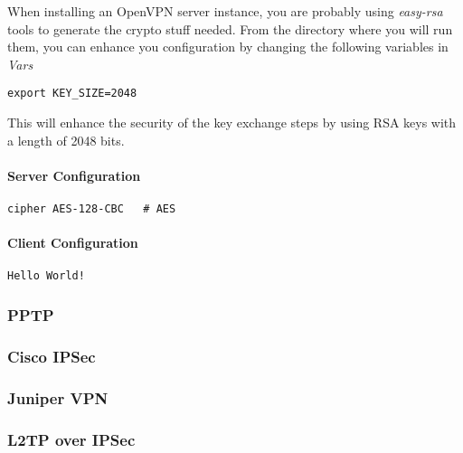 When installing an OpenVPN server instance, you are probably using {\it easy-rsa} tools to generate the crypto stuff needed.
From the directory where you will run them, you can enhance you configuration by changing the following variables in {\it Vars}

\begin{lstlisting}[breaklines]
export KEY_SIZE=2048 
\end{lstlisting}

This will enhance the security of the key exchange steps by using RSA keys with a length of 2048 bits.



\paragraph{Server Configuration}


\begin{lstlisting}[breaklines]
cipher AES-128-CBC   # AES
\end{lstlisting}


\paragraph{Client Configuration}


\begin{lstlisting}[breaklines]
Hello World!
\end{lstlisting}



\subsubsection{PPTP}

\subsubsection{Cisco IPSec}

\subsubsection{Juniper VPN}

\subsubsection{L2TP over IPSec}

